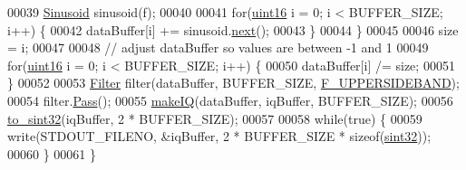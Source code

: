 \begin{DoxyCode}
00039         \hyperlink{classradio_1_1Sinusoid}{Sinusoid} sinusoid(f);
00040 
00041         \textcolor{keywordflow}{for}(\hyperlink{definitions_8hpp_a05f6b0ae8f6a6e135b0e290c25fe0e4e}{uint16} i = 0; i < BUFFER\_SIZE; i++) \{
00042             dataBuffer[i] += sinusoid.\hyperlink{classradio_1_1Sinusoid_aab44298ea1bd5cb175d5826243cf56f2}{next}();
00043         \}
00044     \}
00045 
00046     size = i;
00047     
00048     \textcolor{comment}{// adjust dataBuffer so values are between -1 and 1}
00049     \textcolor{keywordflow}{for}(\hyperlink{definitions_8hpp_a05f6b0ae8f6a6e135b0e290c25fe0e4e}{uint16} i = 0; i < BUFFER\_SIZE; i++) \{
00050         dataBuffer[i] /= size;
00051     \}
00052     
00053     \hyperlink{classradio_1_1Filter}{Filter} filter(dataBuffer, BUFFER\_SIZE, \hyperlink{namespaceradio_a0ec4548711b6d6ed6867c70b3fc2a413}{F\_UPPERSIDEBAND});
00054     filter.\hyperlink{classradio_1_1Filter_ad2793821801780809af385463bf8f197}{Pass}();
00055     \hyperlink{namespaceradio_a7166522e76ff88e8d482491b1b6e2275}{makeIQ}(dataBuffer, iqBuffer, BUFFER\_SIZE);
00056     \hyperlink{namespaceradio_ae4b2334c4366dcdf0311ad79d2067945}{to\_sint32}(iqBuffer, 2 * BUFFER\_SIZE);
00057 
00058     \textcolor{keywordflow}{while}(\textcolor{keyword}{true}) \{
00059         write(STDOUT\_FILENO, &iqBuffer, 2 * BUFFER\_SIZE * \textcolor{keyword}{sizeof}(\hyperlink{definitions_8hpp_a0573de65958b4fda3a0460ed417dafb8}{sint32}));
00060     \}
00061 \}
\end{DoxyCode}
